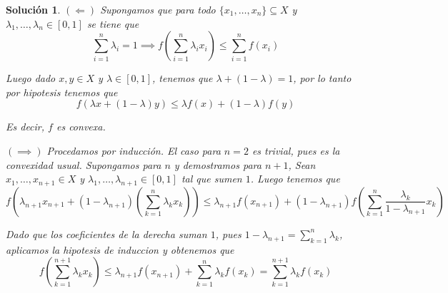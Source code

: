 \documentclass[a4paper,oneside,10.5pt]{USMArt}
\newtheorem{sol}{Soluci\'on}
\begin{document}
\begin{sol}
  $(\Leftarrow)$ Supongamos que para todo $\{x_{1}, \dots, x_{n}\} \subseteq X$ y $\lambda_{1}, \dots, \lambda_{n} \in [0, 1]$ se tiene que
  \begin{equation*}
    \sum_{i = 1}^{n} \lambda_{i} = 1 \implies f(\sum_{i = 1}^{n} \lambda_{i} x_{i}) \leq \sum_{i = 1}^{n} f(x_{i})
  \end{equation*}

  Luego dado $x, y \in X$ y $\lambda \in [0,1]$, tenemos que $\lambda + (1 - \lambda) = 1$, por lo tanto por hipotesis
  tenemos que
  \begin{equation*}
    f(\lambda x + (1 - \lambda) y) \leq \lambda f(x) + (1 - \lambda) f(y)
  \end{equation*}

  Es decir, $f$ es convexa.

  $(\implies)$ Procedamos por inducción. El caso para $n = 2$ es trivial, pues es la convexidad usual. Supongamos para
  $n$ y demostramos para $n + 1$, Sean $x_{1}, \dots, x_{n + 1} \in X$ y $\lambda_{1}, \dots, \lambda_{n + 1} \in [0, 1]$
  tal que sumen $1$. Luego tenemos que
  \begin{equation*}
    f(\lambda_{n + 1} x_{n +1} + (1 - \lambda_{n + 1})(\sum_{k = 1}^{n} \lambda_{k} x_{k})) \leq \lambda_{n + 1}f(x_{n+1}) + (1 - \lambda_{n + 1}) f(\sum_{k = 1}^{n} \frac{\lambda_{k}}{1 - \lambda_{n + 1}} x_{k})
  \end{equation*}

  Dado que los coeficientes de la derecha suman $1$, pues $1 - \lambda_{n + 1} = \sum_{k = 1}^n \lambda_k$, aplicamos la hipotesis de induccion y obtenemos que
  \begin{equation*}
    f(\sum_{k = 1}^{n + 1} \lambda_k x_k) \leq \lambda_{n + 1} f(x_{n + 1}) + \sum_{k = 1}^n \lambda_k f(x_k) =  \sum_{k = 1}^{n + 1} \lambda_k f(x_k)
  \end{equation*}
\end{sol}
\end{document}

